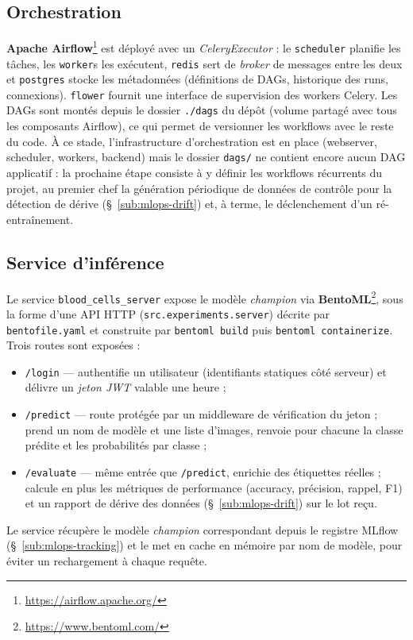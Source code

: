 \subsection{Orchestration}
\label{sub:mlops-orchestration}

\textbf{Apache Airflow}\footnote{\url{https://airflow.apache.org/}} est déployé avec un \emph{CeleryExecutor} : le \texttt{scheduler} planifie les tâches, les \texttt{worker}s les exécutent, \texttt{redis} sert de \emph{broker} de messages entre les deux et \texttt{postgres} stocke les métadonnées (définitions de DAGs, historique des runs, connexions).
\texttt{flower} fournit une interface de supervision des workers Celery.
Les DAGs sont montés depuis le dossier \texttt{./dags} du dépôt (volume partagé avec tous les composants Airflow), ce qui permet de versionner les workflows avec le reste du code.
À ce stade, l'infrastructure d'orchestration est en place (webserver, scheduler, workers, backend) mais le dossier \texttt{dags/} ne contient encore aucun DAG applicatif : la prochaine étape consiste à y définir les workflows récurrents du projet, au premier chef la génération périodique de données de contrôle pour la détection de dérive (\S~\ref{sub:mlops-drift}) et, à terme, le déclenchement d'un ré-entraînement.

\subsection{Service d'inférence}
\label{sub:mlops-serving}

Le service \texttt{blood\_cells\_server} expose le modèle \emph{champion} via \textbf{BentoML}\footnote{\url{https://www.bentoml.com/}}, sous la forme d'une API HTTP (\texttt{src.experiments.server}) décrite par \texttt{bentofile.yaml} et construite par \texttt{bentoml build} puis \texttt{bentoml containerize}.
Trois routes sont exposées :
\begin{itemize}
  \item \texttt{/login} — authentifie un utilisateur (identifiants statiques côté serveur) et délivre un \emph{jeton JWT} valable une heure ;
  \item \texttt{/predict} — route protégée par un middleware de vérification du jeton ; prend un nom de modèle et une liste d'images, renvoie pour chacune la classe prédite et les probabilités par classe ;
  \item \texttt{/evaluate} — même entrée que \texttt{/predict}, enrichie des étiquettes réelles ; calcule en plus les métriques de performance (accuracy, précision, rappel, F1) et un rapport de dérive des données (\S~\ref{sub:mlops-drift}) sur le lot reçu.
\end{itemize}
Le service récupère le modèle \emph{champion} correspondant depuis le registre MLflow (\S~\ref{sub:mlops-tracking}) et le met en cache en mémoire par nom de modèle, pour éviter un rechargement à chaque requête.

